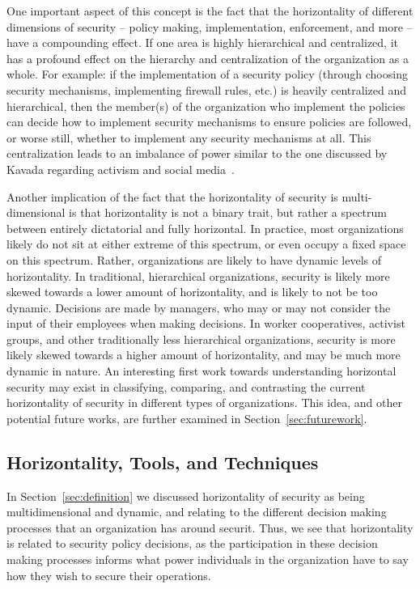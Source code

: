 One important aspect of this concept is the fact that the horizontality of 
different dimensions of security -- policy making, implementation, enforcement,
and more -- have a compounding effect. If one area is highly hierarchical and
centralized, it has a profound effect on the hierarchy and centralization of the
organization as a whole. For example: if the implementation of a security policy
(through choosing security mechanisms, implementing firewall rules, etc.) is
heavily centralized and hierarchical, then the member(s) of the organization who
implement the policies can decide how to implement security mechanisms to ensure
policies are followed, or worse still, whether to implement any security
mechanisms at all. This centralization leads to an imbalance of power similar to
the one discussed by Kavada regarding activism and social
media~\cite{kavada2020counterpublics}.

Another implication of the fact that the horizontality of security is
multi-dimensional is that horizontality is not a binary trait, but rather a
spectrum between entirely dictatorial and fully horizontal. In practice, most
organizations likely do not sit at either extreme of this spectrum, or even
occupy a fixed space on this spectrum. Rather, organizations are likely to have
dynamic levels of horizontality. In traditional, hierarchical organizations,
security is likely more skewed towards a lower amount of horizontality, and is
likely to not be too dynamic. Decisions are made by managers, who may or may not
consider the input of their employees when making decisions. In worker
cooperatives,  activist groups, and other traditionally less hierarchical
organizations, security is more likely skewed towards a higher amount of
horizontality, and may be much more dynamic in nature. An interesting first work
towards understanding horizontal security may exist in classifying, comparing,
and contrasting the current horizontality of security in different types of
organizations. This idea, and other potential future works, are further examined
in Section~\ref{sec:futurework}.

\subsection{Horizontality, Tools, and Techniques}
In Section~\ref{sec:definition} we discussed horizontality of security as being
multidimensional and dynamic, and relating to the different decision making
processes that an organization has around securit. Thus, we see that
horizontality is related to security policy decisions, as the participation in
these decision making processes informs what power individuals in the
organization have to say how they wish to secure their operations.

